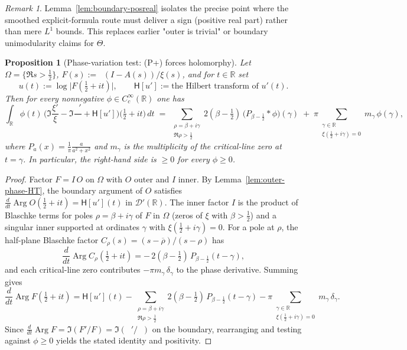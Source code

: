 \documentclass[11pt]{article}
\newtheorem{proposition}[theorem]{Proposition}
\theoremstyle{definition}
\theoremstyle{remark}
\newtheorem{remark}[theorem]{Remark}
\newcommand{\R}{\mathbb{R}}
\DeclareMathOperator{\dettwo}{det_2}
\DeclareMathOperator{\Arg}{Arg}
\begin{document}
\begin{remark}
Lemma~\ref{lem:boundary-posreal} isolates the precise point where the smoothed explicit-formula route must deliver a sign (positive real part) rather than mere $L^1$ bounds. This replaces earlier "outer is trivial" or boundary unimodularity claims for \(\Theta\).
\end{remark}

\begin{proposition}[Phase-variation test: (P+) forces holomorphy]\label{prop:Pplus-holomorphy}
Let \(\Omega=\{\Re s>\tfrac12\}\), \(F(s):=\dettwo(I-A(s))/\xi(s)\), and for \(t\in\R\) set
\[
 u(t):=\log\big|F(\tfrac12+it)\big|,\qquad
 \mathsf H[u']:=\text{the Hilbert transform of }u'(t).
\]
Then for every nonnegative \(\phi\in C_c^\infty(\R)\) one has
\[
\int_{\R}\!\phi(t)\,\Big(\Im\frac{\xi'}{\xi}-\Im\frac{\dettwo'}{\dettwo}+\mathsf H[u']\Big)\!\Big(\tfrac12+it\Big)\,dt
\;=\;\sum_{\substack{\rho=\beta+i\gamma\\ \Re\rho>\tfrac12}}\! 2(\beta-\tfrac12)\,\big(P_{\beta-\tfrac12}\!\ast\phi\big)(\gamma)
\; +\; \pi\!\!\sum_{\substack{\gamma\in\R\\ \xi(\tfrac12+i\gamma)=0}}\! m_\gamma\,\phi(\gamma),
\]
where \(P_a(x)=\frac{1}{\pi}\frac{a}{a^2+x^2}\) and \(m_\gamma\) is the multiplicity of the critical-line zero at \(t=\gamma\). In particular, the right-hand side is \(\ge 0\) for every \(\phi\ge 0\).
\end{proposition}
\begin{proof}
Factor \(F=I\,O\) on \(\Omega\) with \(O\) outer and \(I\) inner. By Lemma~\ref{lem:outer-phase-HT}, the boundary argument of \(O\) satisfies \(\frac{d}{dt}\Arg O(\tfrac12+it)=\mathsf H[u'](t)\) in \(\mathcal D'(\R)\). The inner factor \(I\) is the product of Blaschke terms for poles \(\rho=\beta+i\gamma\) of \(F\) in \(\Omega\) (zeros of \(\xi\) with \(\beta>\tfrac12\)) and a singular inner supported at ordinates \(\gamma\) with \(\xi(\tfrac12+i\gamma)=0\). For a pole at \(\rho\), the half-plane Blaschke factor \(C_\rho(s)=(s-\overline\rho)/(s-\rho)\) has
\[
\frac{d}{dt}\Arg C_\rho(\tfrac12+it)=-\,2(\beta-\tfrac12)\,P_{\beta-\tfrac12}(t-\gamma),
\]
and each critical-line zero contributes \(-\pi m_\gamma\,\delta_\gamma\) to the phase derivative. Summing gives
\[
\frac{d}{dt}\Arg F(\tfrac12+it)=\mathsf H[u'](t)
-\sum_{\substack{\rho=\beta+i\gamma\\ \Re\rho>\tfrac12}}\! 2(\beta-\tfrac12)\,P_{\beta-\tfrac12}(t-\gamma)
-\pi\!\!\sum_{\substack{\gamma\in\R\\ \xi(\tfrac12+i\gamma)=0}}\! m_\gamma\,\delta_\gamma.
\]
Since \(\frac{d}{dt}\Arg F=\Im(F'/F)=\Im(\dettwo'/\dettwo)\) on the boundary, rearranging and testing against \(\phi\ge 0\) yields the stated identity and positivity.
\end{proof}
\end{document}
